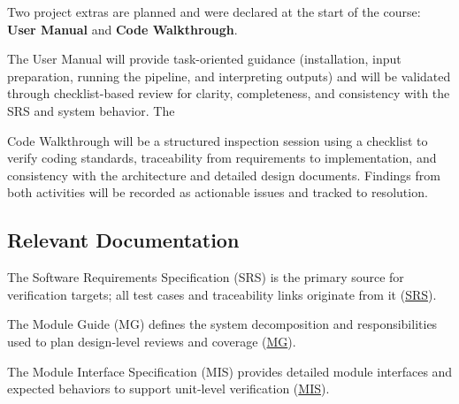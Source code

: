 \documentclass[12pt, titlepage]{article}
\begin{document}
Two project extras are planned and were declared at the start of the course:
\textbf{User Manual} and \textbf{Code Walkthrough}. 

The User Manual will provide task-oriented guidance (installation, input preparation, running the pipeline,
and interpreting outputs) and will be validated through checklist-based review
for clarity, completeness, and consistency with the SRS and system behavior. The

Code Walkthrough will be a structured inspection session using a checklist to
verify coding standards, traceability from requirements to implementation, and
consistency with the architecture and detailed design documents. Findings from
both activities will be recorded as actionable issues and tracked to resolution.

\subsection{Relevant Documentation}


The Software Requirements Specification (SRS) is the primary source for
verification targets; all test cases and traceability links originate from it
(\href{../SRS/SRS.tex}{SRS}).

The Module Guide (MG) defines the system
decomposition and responsibilities used to plan design-level reviews and
coverage (\href{../Design/SoftArchitecture/MG.tex}{MG}).

The Module Interface Specification (MIS) provides detailed module interfaces and expected behaviors
to support unit-level verification (\href{../Design/SoftDetailedDes/MIS.tex}{MIS}).
\end{document}
